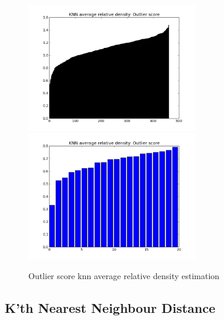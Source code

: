 \begin{figure}[H]
\centering
\includegraphics[width=7.5cm, keepaspectratio=true]{pictures/knnAvgdensityEstimationAll.png}
\includegraphics[width=7.5cm, keepaspectratio=true]{pictures/knnAvgdensityEstimation20.png}
\vspace{-0.4cm}
\caption{\footnotesize Outlier score knn average relative density estimation}
\label{avg}
\end{figure}

\subsection{K'th Nearest Neighbour Distance}

